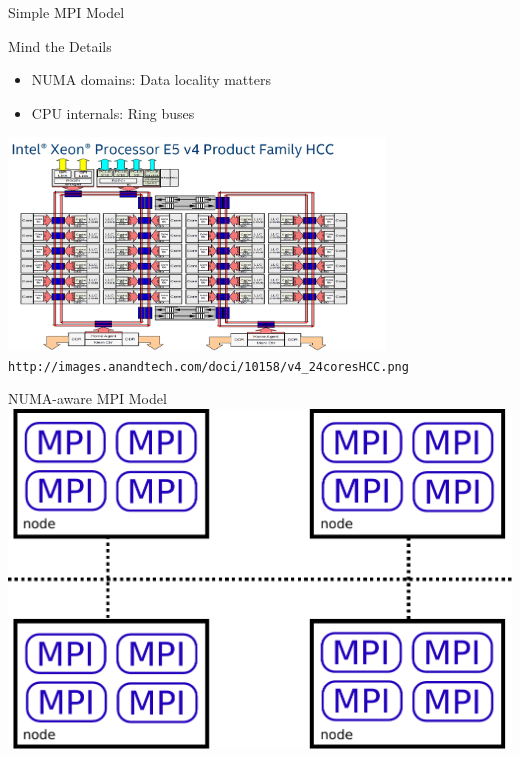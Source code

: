 \begin{frame}{Simple MPI Model}
 \begin{minipage}{0.55\textwidth}
  \begin{block}{Mind the Details}
   \begin{itemize}
    \item NUMA domains: Data locality matters
    \item CPU internals: Ring buses
   \end{itemize}
  \end{block}
 \end{minipage}

  \begin{center}
   \includegraphics[width=0.75\textwidth]{figures/BroadwellXeonSchematic} \\
   {\scriptsize \texttt{http://images.anandtech.com/doci/10158/v4\_24coresHCC.png} }
  \end{center}

\end{frame}



\begin{frame}{NUMA-aware MPI Model}
  \includegraphics[width=1.0\textwidth]{figures/numa-mpi}
\end{frame}

